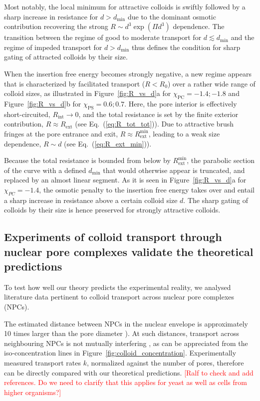 \documentclass[12pt, a4paper]{article}
\newcommand\todo[1]{\textcolor{red}{#1}}
\begin{document}
Most notably, the local minimum for attractive colloids is swiftly followed by a sharp increase in resistance for $d > d_{\text{min}}$ due to the dominant osmotic contribution recovering the strong $R \sim d^3 \exp(\Pi d^3)$ dependence.
The transition between the regime of good to moderate transport for $d \lesssim d_{\text{min}}$ and the regime of impeded transport for $d > d_{\text{min}}$ thus defines the condition for sharp gating of attracted colloids by their size.

When the insertion free energy becomes strongly negative, a new regime appears that is characterized by facilitated transport ($R < R_0$) over a rather wide range of colloid sizes, as illustrated in 
Figure~\ref{fig:R_vs_d}a for $\chi_{\text{PC}} = -1.4; - 1.8$ and Figure~\ref{fig:R_vs_d}b for $\chi_{\text{PS}} = 0.6;0.7$.
Here, the pore interior is effectively short-circuited, $R_{\text{int}} \to 0$, and the total resistance is set by the finite exterior contribution, $R \approx R_{\text{ext}}$ (see Eq.~(\ref{eq:R_tot_tot})).
Due to attractive brush fringes at the pore entrance and exit, $R \approx R_{\text{ext}}^{\text{min}}$, leading to a weak size dependence, $R \sim d$ (see Eq.~(\ref{eq:R_ext_min})).

Because the total resistance is bounded from below by $R_{\text{ext}}^{\text{min}}$, the parabolic section of the curve with a defined $d_{\text{min}}$ that would otherwise appear is truncated, and replaced by an almost linear segment.
As it is seen in Figure~\ref{fig:R_vs_d}a for $\chi_{PC}= -1.4$, the osmotic penalty to the insertion free energy takes over and entail a sharp increase in resistance above a certain colloid size $d$.
The sharp gating of colloids by their size is hence preserved for strongly attractive colloids.


\subsection{Experiments of colloid transport through nuclear pore complexes validate the theoretical predictions}

To test how well our theory predicts the experimental reality, we analysed literature data pertinent to colloid transport across nuclear pore complexes (NPCs).

The estimated distance between NPCs in the nuclear envelope is approximately 10 times larger than the pore diameter \cite{Yang2004, Daigle2001, Feldherr1984, Kubitscheck2000}). At such distances, transport across neighbouring NPCs is not mutually interfering \cite{Fabrikant1985}, as can be appreciated from the iso-concentration lines in Figure~\ref{fig:colloid_concentration}. Experimentally measured transport rates $k$, normalized against the number of pores, therefore can be directly compared with our theoretical predictions.
\todo{[Ralf to check and add references. Do we need to clarify that this applies for yeast as well as cells from higher organisms?]} 
\end{document}
